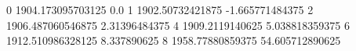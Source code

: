 0 1904.173095703125 0.0
1 1902.50732421875 -1.665771484375
2 1906.487060546875 2.31396484375
4 1909.2119140625 5.038818359375
6 1912.510986328125 8.337890625
8 1958.77880859375 54.605712890625
